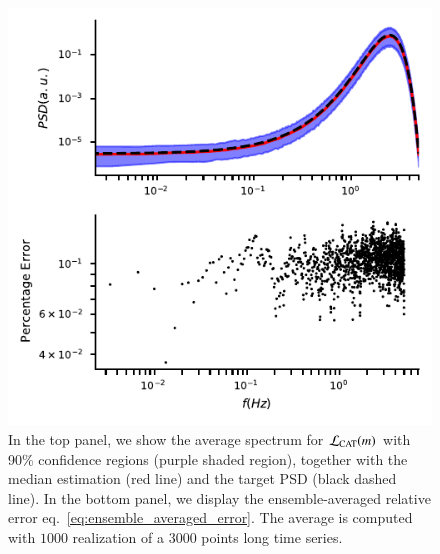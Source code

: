 \documentclass{aa}
\begin{document}
\begin{figure}[t]
	\centering
	\includegraphics[width = \linewidth]{Images/optimisers_comparison/normal/CAT_spectrum_estim.pdf}
	\caption{In the top panel, we show the average spectrum for $\mathcal{L}_{\rm CAT}(m)$ with 90\% confidence regions (purple shaded region), together with the median estimation (red line) and the target PSD (black dashed line). In the bottom panel, we display the ensemble-averaged relative error eq.~\eqref{eq:ensemble_averaged_error}. The average is computed with $1000$ realization of a $3000$ points long time series.}
	\label{fig:CATmean}
\end{figure} 
\end{document}
